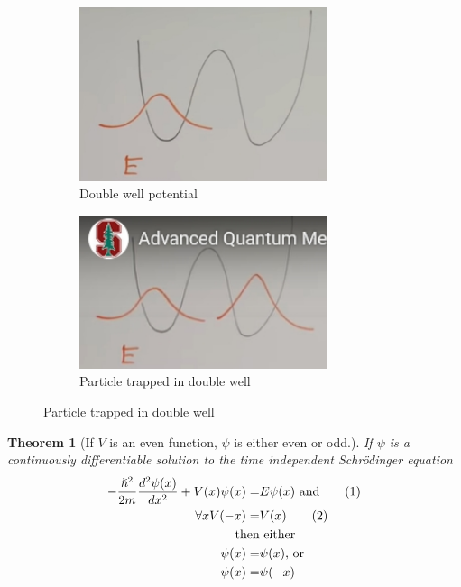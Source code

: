 \documentclass[]{article}
\newcommand\numberthis{\addtocounter{equation}{1}\tag{\theequation}}
\newtheorem{thm}{Theorem}
\begin{document}
\begin{figure}[H]
	\caption{Double well potential}
	\begin{subfigure}{0.5\textwidth}
		\caption{Double well potential}\label{fig:particle_mixed_left}
		\includegraphics[width=0.8\textwidth]{particle_mixed_left}
	\end{subfigure}
	\begin{subfigure}{0.5\textwidth}
		\caption{Particle trapped in double well}\label{fig:double:well}
		\includegraphics[width=0.8\textwidth]{particle_mixed}
	\end{subfigure}
\end{figure}



\begin{thm}[If $V$ is an even function, $\psi$ is either even or odd.]
	If  $\psi$  is a continuously differentiable solution to the time independent Schr\"odinger equation
	\begin{align*}
	-\frac{\hslash^2}{2m}\frac{d^2 \psi(x)}{d x^2} + V(x)\psi(x) =& E\psi(x) \text{ and}\numberthis \label{eq:ti:schroedinger}\\
	\forall x V(-x) =& V(x) \numberthis \label{eq:even_V}\\
	\text{then}&\text{ either}\\
	\psi(x) =& \psi(x)\text{, or}\\
	\psi(x) =& \psi(-x)
	\end{align*}
\end{thm}
\end{document}
